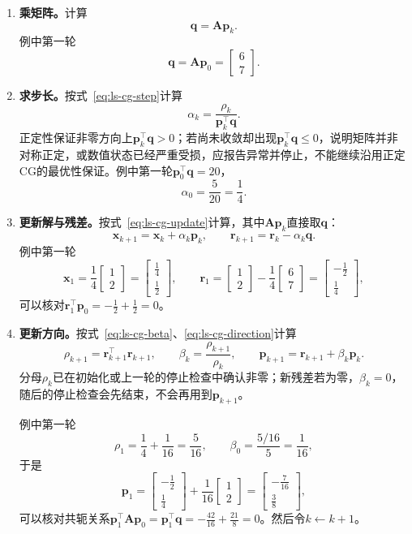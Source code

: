 \begin{enumerate}
 \item \textbf{乘矩阵。}计算
 \[
  \bm q=\bm A\bm p_k .
 \]
 例中第一轮
 \[
  \bm q=\bm A\bm p_0=\begin{bmatrix}6\\7\end{bmatrix}.
 \]

 \item \textbf{求步长。}按式~\eqref{eq:ls-cg-step}计算
 \[
  \alpha_k=\frac{\rho_k}{\bm p_k^\top\bm q} .
 \]
 正定性保证非零方向上$\bm p_k^\top\bm q>0$；若尚未收敛却出现$\bm p_k^\top\bm q\le0$，说明矩阵并非对称正定，或数值状态已经严重受损，应报告异常并停止，不能继续沿用正定CG的最优性保证。例中第一轮$\bm p_0^\top\bm q=20$，
 \[
  \alpha_0=\frac5{20}=\frac14 .
 \]

 \item \textbf{更新解与残差。}按式~\eqref{eq:ls-cg-update}计算，其中$\bm A\bm p_k$直接取$\bm q$：
 \[
  \bm x_{k+1}=\bm x_k+\alpha_k\bm p_k,\qquad \bm r_{k+1}=\bm r_k-\alpha_k\bm q .
 \]
 例中第一轮
 \[
  \bm x_1=\frac14\begin{bmatrix}1\\2\end{bmatrix}=\begin{bmatrix}\tfrac14\\\tfrac12\end{bmatrix},\qquad
  \bm r_1=\begin{bmatrix}1\\2\end{bmatrix}-\frac14\begin{bmatrix}6\\7\end{bmatrix}=\begin{bmatrix}-\tfrac12\\\tfrac14\end{bmatrix},
 \]
 可以核对$\bm r_1^\top\bm p_0=-\tfrac12+\tfrac12=0$。

 \item \textbf{更新方向。}按式~\eqref{eq:ls-cg-beta}、\eqref{eq:ls-cg-direction}计算
 \[
  \rho_{k+1}=\bm r_{k+1}^\top\bm r_{k+1},\qquad \beta_k=\frac{\rho_{k+1}}{\rho_k},\qquad \bm p_{k+1}=\bm r_{k+1}+\beta_k\bm p_k .
 \]
 分母$\rho_k$已在初始化或上一轮的停止检查中确认非零；新残差若为零，$\beta_k=0$，随后的停止检查会先结束，不会再用到$\bm p_{k+1}$。

 例中第一轮
 \[
  \rho_1=\frac14+\frac1{16}=\frac5{16},\qquad \beta_0=\frac{5/16}{5}=\frac1{16},
 \]
 于是
 \[
  \bm p_1=\begin{bmatrix}-\tfrac12\\\tfrac14\end{bmatrix}+\frac1{16}\begin{bmatrix}1\\2\end{bmatrix}=\begin{bmatrix}-\tfrac7{16}\\\tfrac38\end{bmatrix},
 \]
 可以核对共轭关系$\bm p_1^\top\bm A\bm p_0=\bm p_1^\top\bm q=-\tfrac{42}{16}+\tfrac{21}8=0$。然后令$k\leftarrow k+1$。


\end{enumerate}
